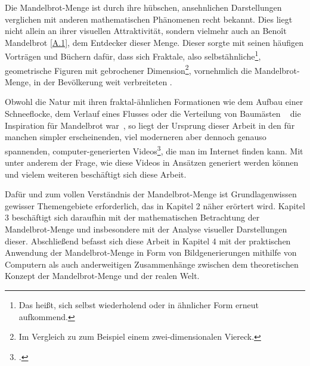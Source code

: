 
Die Mandelbrot-Menge ist durch ihre hübschen, ansehnlichen Darstellungen verglichen
mit anderen mathematischen Phänomenen recht bekannt.
Dies liegt nicht allein an ihrer visuellen Attraktivität,
sondern vielmehr auch an Benoît Mandelbrot \hyperref[app:1]{[A.1]},
dem Entdecker dieser Menge.
Dieser sorgte mit seinen häufigen Vorträgen und Büchern dafür, dass sich Fraktale,
also selbstähnliche\footnote{
  Das heißt, sich selbst wiederholend oder in ähnlicher Form erneut aufkommend.
}, geometrische Figuren mit gebrochener Dimension\footnote{
  Im Vergleich zu zum Beispiel einem zwei-dimensionalen Viereck.
},
vornehmlich die Mandelbrot-Menge, in der Bevölkerung weit verbreiteten
\cite[Vgl. letzten Absatz]{ibm_fractal_2011}.

Obwohl die Natur mit ihren fraktal-ähnlichen Formationen wie dem Aufbau einer
Schneeflocke, dem Verlauf eines Flusses oder die Verteilung von Baumästen
~\cite{nnart_fractals_nodate} die Inspiration für Mandelbrot war~\cite{zink_kosmische_2014},
so liegt der Ursprung dieser Arbeit in den für
manchen simpler erscheinenden, viel moderneren aber dennoch genauso spannenden,
computer-generierten Videos\footcite[Vgl. bspw.][]{maths_town_eye_2017},
die man im Internet finden kann.
Mit unter anderem der Frage, wie diese Videos in Ansätzen generiert werden können
und vielem weiteren beschäftigt sich diese Arbeit.

Dafür und zum vollen Verständnis der Mandelbrot-Menge ist Grundlagenwissen
gewisser Themengebiete erforderlich, das in Kapitel 2 näher erörtert wird.
Kapitel 3 beschäftigt sich daraufhin mit der mathematischen Betrachtung der
Mandelbrot-Menge und insbesondere mit der Analyse visueller Darstellungen dieser.
Abschließend befasst sich diese Arbeit in Kapitel 4 mit der praktischen Anwendung
der Mandelbrot-Menge in Form von Bildgenerierungen mithilfe von Computern als auch
anderweitigen Zusammenhänge zwischen dem theoretischen Konzept
der Mandelbrot-Menge und der realen Welt.